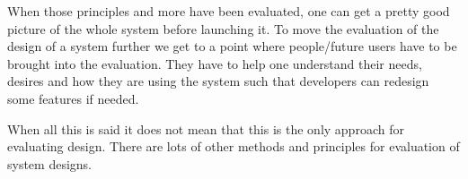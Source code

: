 When those principles and more have been evaluated, one can get a pretty good picture of the whole system before launching it.%
To move the evaluation of the design of a system further we get to a point where people/future users have to be brought into the evaluation. They have to help one understand their needs, desires and how they are using the system such that developers can redesign some features if needed. %

When all this is said it does not mean that this is the only approach for evaluating design. There are lots of other methods and principles for evaluation of system designs. 


